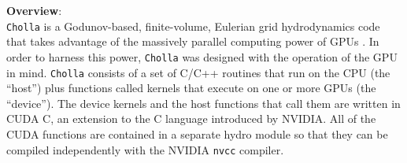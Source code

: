 \documentclass[11pt,letterpaper,english]{article}
\begin{document}

{\bf Overview}:\\
{\tt Cholla} is a Godunov\cite{Godunov59}-based, finite-volume, Eulerian grid 
hydrodynamics code that takes advantage of the massively parallel computing power of GPUs \cite{Schneider15}. 
In order to harness this power, {\tt Cholla} was designed with the operation of the GPU in mind. 
{\tt Cholla} consists of a set of C/C++ routines that run on the CPU 
(the ``host'') plus functions called kernels that execute on one or
more GPUs (the ``device''). The device kernels and the host functions that call them are written in CUDA C, an extension to the C language introduced by NVIDIA. All of the CUDA functions are contained in a separate hydro module so that they can be compiled independently with the NVIDIA {\tt nvcc} compiler. %
\end{document}
